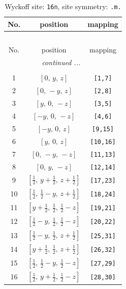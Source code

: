 \documentclass[fleqn,8pt]{jsarticle}
\begin{document}
\renewcommand{\arraystretch}{1.2}
\begin{longtable}{ccc}
\caption{Wyckoff site: {\tt 16n}, site symmetry: {\tt .m.}}
 \\
 \hline \hline
No. & position & mapping \\ \hline \endfirsthead

\multicolumn{2}{l}{\tablename\ \thetable{}} \\
 \hline \hline
No. & position & mapping \\ \hline \endhead

 \hline \hline
\multicolumn{2}{r}{\footnotesize\it continued ...} \\ \endfoot

 \hline \hline
\multicolumn{2}{r}{} \\ \endlastfoot

1 & $\left[ 0,\, y,\, z \right]$ & {\tt [1,7]} \\ \hline
2 & $\left[ 0,\, - y,\, z \right]$ & {\tt [2,8]} \\ \hline
3 & $\left[ y,\, 0,\, - z \right]$ & {\tt [3,5]} \\ \hline
4 & $\left[ - y,\, 0,\, - z \right]$ & {\tt [4,6]} \\ \hline
5 & $\left[ - y,\, 0,\, z \right]$ & {\tt [9,15]} \\ \hline
6 & $\left[ y,\, 0,\, z \right]$ & {\tt [10,16]} \\ \hline
7 & $\left[ 0,\, - y,\, - z \right]$ & {\tt [11,13]} \\ \hline
8 & $\left[ 0,\, y,\, - z \right]$ & {\tt [12,14]} \\ \hline
9 & $\left[ \frac{1}{2},\, y + \frac{1}{2},\, z + \frac{1}{2} \right]$ & {\tt [17,23]} \\ \hline
10 & $\left[ \frac{1}{2},\, \frac{1}{2} - y,\, z + \frac{1}{2} \right]$ & {\tt [18,24]} \\ \hline
11 & $\left[ y + \frac{1}{2},\, \frac{1}{2},\, \frac{1}{2} - z \right]$ & {\tt [19,21]} \\ \hline
12 & $\left[ \frac{1}{2} - y,\, \frac{1}{2},\, \frac{1}{2} - z \right]$ & {\tt [20,22]} \\ \hline
13 & $\left[ \frac{1}{2} - y,\, \frac{1}{2},\, z + \frac{1}{2} \right]$ & {\tt [25,31]} \\ \hline
14 & $\left[ y + \frac{1}{2},\, \frac{1}{2},\, z + \frac{1}{2} \right]$ & {\tt [26,32]} \\ \hline
15 & $\left[ \frac{1}{2},\, \frac{1}{2} - y,\, \frac{1}{2} - z \right]$ & {\tt [27,29]} \\ \hline
16 & $\left[ \frac{1}{2},\, y + \frac{1}{2},\, \frac{1}{2} - z \right]$ & {\tt [28,30]} \\
\end{longtable}
\end{document}
